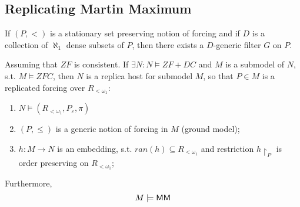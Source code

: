 \subsection{Replicating Martin Maximum}\label{subsection_rep_mm}




\begin{definition}\label{def_mm}
    If \((P, <)\) is a stationary set preserving notion of forcing and if \(D\) is a collection of \(\aleph_1\) dense subsets of \(P\), then there exists a \(D\)-generic filter $G$ on \(P\).
\end{definition}

\begin{theorem}\label{theorem_mmm}
    Assuming that $ZF$ is consistent. If $\exists N: N \models ZF + DC$ and $M$ is a submodel of $N$, s.t. $M \models ZFC$, then $N$ is a replica host for submodel $M$, so that $P \in M$ is a replicated forcing over $R_{<\omega_1}$: 
    \begin{enumerate}
        \item $N \models (R_{<\omega_1}, P_\varepsilon, \pi)$
        \item $(P, \leq)$ is a generic notion of forcing in $M$ (ground model);
        \item $h: M \to N$ is an embedding, s.t. $ran(h) \subseteq R_{<\omega_1}$ and restriction $h{\upharpoonright}_P$ is order preserving on $R_{<\omega_1}$;
    \end{enumerate}
    Furthermore, 
        \[ M \models {\sf MM} \]
\end{theorem}
